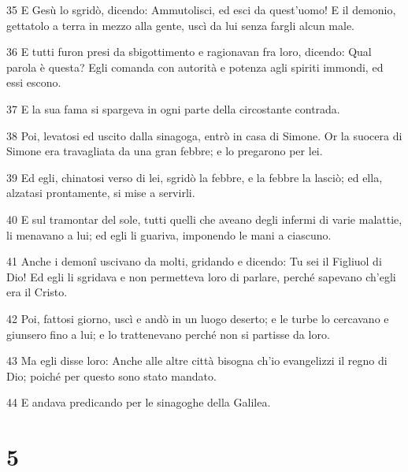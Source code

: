 \par 35 E Gesù lo sgridò, dicendo: Ammutolisci, ed esci da quest'uomo! E il demonio, gettatolo a terra in mezzo alla gente, uscì da lui senza fargli alcun male.
\par 36 E tutti furon presi da sbigottimento e ragionavan fra loro, dicendo: Qual parola è questa? Egli comanda con autorità e potenza agli spiriti immondi, ed essi escono.
\par 37 E la sua fama si spargeva in ogni parte della circostante contrada.
\par 38 Poi, levatosi ed uscito dalla sinagoga, entrò in casa di Simone. Or la suocera di Simone era travagliata da una gran febbre; e lo pregarono per lei.
\par 39 Ed egli, chinatosi verso di lei, sgridò la febbre, e la febbre la lasciò; ed ella, alzatasi prontamente, si mise a servirli.
\par 40 E sul tramontar del sole, tutti quelli che aveano degli infermi di varie malattie, li menavano a lui; ed egli li guariva, imponendo le mani a ciascuno.
\par 41 Anche i demonî uscivano da molti, gridando e dicendo: Tu sei il Figliuol di Dio! Ed egli li sgridava e non permetteva loro di parlare, perché sapevano ch'egli era il Cristo.
\par 42 Poi, fattosi giorno, uscì e andò in un luogo deserto; e le turbe lo cercavano e giunsero fino a lui; e lo trattenevano perché non si partisse da loro.
\par 43 Ma egli disse loro: Anche alle altre città bisogna ch'io evangelizzi il regno di Dio; poiché per questo sono stato mandato.
\par 44 E andava predicando per le sinagoghe della Galilea.

\chapter{5}

